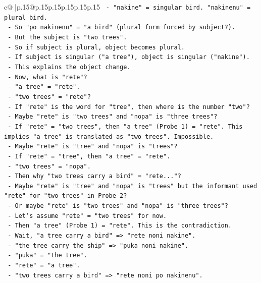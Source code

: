 \documentclass{article}
\begin{document}
{\begin{supertabular}{c@{$\;$}|p{.15\linewidth}@{}p{.15\linewidth}p{.15\linewidth}p{.15\linewidth}p{.15\linewidth}p{.15\linewidth}}
{{{\texttt{   {-} "nakine" = singular bird. "nakinenu" = plural bird.} \\
\texttt{   {-} So "po nakinenu" = "a bird" (plural form forced by subject?).} \\
\texttt{   {-} But the subject is "two trees".} \\
\texttt{   {-} So if subject is plural, object becomes plural.} \\
\texttt{   {-} If subject is singular ("a tree"), object is singular ("nakine").} \\
\texttt{   {-} This explains the object change.} \\
\texttt{   {-} Now, what is "rete"?} \\
\texttt{   {-} "a tree" = "rete".} \\
\texttt{   {-} "two trees" = "rete"?} \\
\texttt{   {-} If "rete" is the word for "tree", then where is the number "two"?} \\
\texttt{   {-} Maybe "rete" is "two trees" and "nopa" is "three trees"?} \\
\texttt{   {-} If "rete" = "two trees", then "a tree" (Probe 1) = "rete". This implies "a tree" is translated as "two trees". Impossible.} \\
\texttt{   {-} Maybe "rete" is "tree" and "nopa" is "trees"?} \\
\texttt{   {-} If "rete" = "tree", then "a tree" = "rete".} \\
\texttt{   {-} "two trees" = "nopa".} \\
\texttt{   {-} Then why "two trees carry a bird" = "rete..."?} \\
\texttt{   {-} Maybe "rete" is "tree" and "nopa" is "trees" but the informant used "rete" for "two trees" in Probe 2?} \\
\texttt{   {-} Or maybe "rete" is "two trees" and "nopa" is "three trees"?} \\
\texttt{   {-} Let's assume "rete" = "two trees" for now.} \\
\texttt{   {-} Then "a tree" (Probe 1) = "rete". This is the contradiction.} \\
\texttt{   {-} Wait, "a tree carry a bird" => "rete noni nakine".} \\
\texttt{   {-} "the tree carry the ship" => "puka noni nakine".} \\
\texttt{   {-} "puka" = "the tree".} \\
\texttt{   {-} "rete" = "a tree".} \\
\texttt{   {-} "two trees carry a bird" => "rete noni po nakinenu".} \\
}}}
\end{supertabular}}
\end{document}
